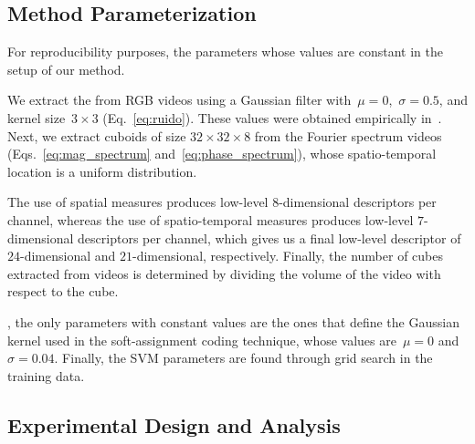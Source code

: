 \subsection{Method Parameterization}\label{subsec:setup}
\label{sec:setup}
For reproducibility purposes,  the parameters whose values are constant in the setup of our method. 

We extract the  from RGB videos using a Gaussian filter with~$\mu = 0$,~$\sigma = 0.5$, and kernel size~$ 3 \times 3$ (Eq.~\ref{eq:ruido}). These values were obtained empirically in~\cite{Pinto:SIBGRAPI:2012}. Next, we extract cuboids of size $32 \times 32 \times 8$ from the Fourier spectrum videos (Eqs.~\ref{eq:mag_spectrum} and~\ref{eq:phase_spectrum}), whose spatio-temporal location is  a uniform distribution. 

The use of spatial measures produces {low-level $8$-dimensional descriptors} per channel, whereas the use of spatio-temporal measures produces low-level $7$-dimensional descriptors per channel, which gives us a final low-level descriptor of $24$-dimensional and $21$-dimensional, respectively. Finally, the number of cubes extracted from videos is determined by dividing the volume of the video with respect to the cube.

, the only parameters with constant values are the ones that define the Gaussian kernel used in the soft-assignment coding technique, whose values are~$\mu = 0$ and~$\sigma = 0.04$. Finally, the SVM parameters are found through grid search in  the training data.

\subsection{Experimental Design and Analysis}\label{subsec:analysis}

